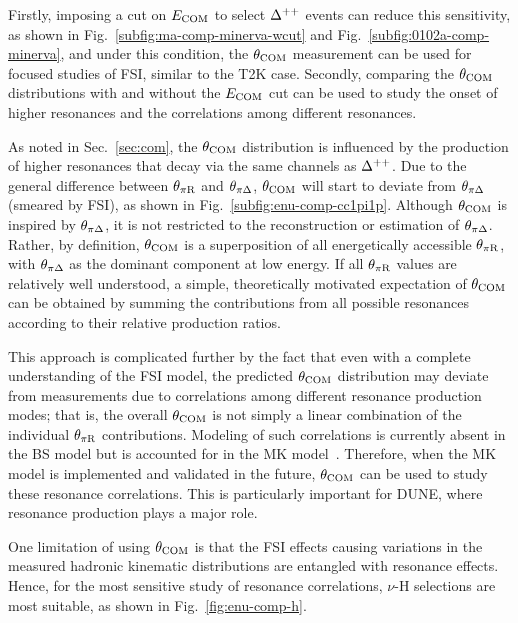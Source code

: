      Firstly, imposing a cut on $E_{\textrm{COM}}$ to select $\Delta^{++}$ events can reduce this sensitivity, as shown in Fig.~\ref{subfig:ma-comp-minerva-wcut} and Fig.~\ref{subfig:0102a-comp-minerva}, and under this condition, the $\theta_{\textrm{COM}}$ measurement can be used for focused studies of FSI, similar to the T2K case.
     Secondly, comparing the $\theta_{\textrm{COM}}$ distributions with and without the $E_{\textrm{COM}}$ cut can be used to study the onset of higher resonances and the correlations among different resonances.

     As noted in Sec.~\ref{sec:com}, the $\theta_{\textrm{COM}}$ distribution is influenced by the production of higher resonances that decay via the same channels as $\Delta^{++}$.
     Due to the general difference between $\theta_{\pi\textrm{R}}$ and $\theta_{\pi\Delta}$, $\theta_{\textrm{COM}}$ will start to deviate from $\theta_{\pi\Delta}$ (smeared by FSI), as shown in Fig.~\ref{subfig:enu-comp-cc1pi1p}.
     Although $\theta_{\textrm{COM}}$ is inspired by $\theta_{\pi\Delta}$, it is not restricted to the reconstruction or estimation of $\theta_{\pi\Delta}$. 
     Rather, by definition, $\theta_{\textrm{COM}}$ is a superposition of all energetically accessible $\theta_{\pi\textrm{R}}$, with $\theta_{\pi\Delta}$ as the dominant component at low energy.
     If all $\theta_{\pi\textrm{R}}$ values are relatively well understood, a simple, theoretically motivated expectation of $\theta_{\textrm{COM}}$ can be obtained by summing the contributions from all possible resonances according to their relative production ratios.

     This approach is complicated further by the fact that even with a complete understanding of the FSI model, the predicted $\theta_{\textrm{COM}}$ distribution may deviate from measurements due to correlations among different resonance production modes; that is, the overall $\theta_{\textrm{COM}}$ is not simply a linear combination of the individual $\theta_{\pi\textrm{R}}$ contributions.
     Modeling of such correlations is currently absent in the BS model but is accounted for in the MK model~\cite{Kabirnezhad:2017jmf,Kabirnezhad:2020wtp,Kabirnezhad:2022znc}.
     Therefore, when the MK model is implemented and validated in the future, $\theta_{\textrm{COM}}$ can be used to study these resonance correlations.
     This is particularly important for DUNE, where resonance production plays a major role.

     One limitation of using $\theta_{\textrm{COM}}$ is that the FSI effects causing variations in the measured hadronic kinematic distributions are entangled with resonance effects.
     Hence, for the most sensitive study of resonance correlations, $\nu$-H selections are most suitable, as shown in Fig.~\ref{fig:enu-comp-h}.

